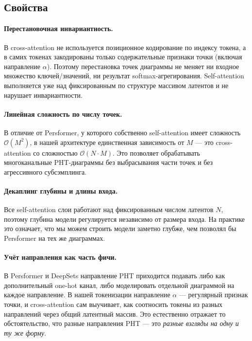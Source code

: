 \subsection{Свойства}

\paragraph{Перестановочная инвариантность.} В cross-attention не используется позиционное кодирование по индексу токена, а в самих токенах закодированы только содержательные признаки точки (включая направление $\alpha$). Поэтому перестановка точек диаграммы не меняет ни входное множество ключей/значений, ни результат softmax-агрегирования. Self-attention выполняется уже над фиксированным по структуре массивом латентов и не нарушает инвариантности.

\paragraph{Линейная сложность по числу точек.} В отличие от Persformer, у которого собственно self-attention имеет сложность $\mathcal{O}(M^2)$, в нашей архитектуре единственная зависимость от $M$ --- это cross-attention со сложностью $\mathcal{O}(N \cdot M)$. Это позволяет обрабатывать многоканальные PHT-диаграммы без выбрасывания части точек и без агрессивного субсэмплинга.

\paragraph{Декаплинг глубины и длины входа.} Все self-attention слои работают над фиксированным числом латентов $N$, поэтому глубина модели регулируется независимо от размера входа. На практике это означает, что мы можем строить модели заметно глубже, чем позволял бы Persformer на тех же диаграммах.

\paragraph{Учёт направления как часть фичи.} В Persformer и DeepSets направление PHT приходится подавать либо как дополнительный one-hot канал, либо моделировать отдельной диаграммой на каждое направление. В нашей токенизации направление $\alpha$ --- регулярный признак точки, и cross-attention сам выучивает, как соотносить токены из разных направлений через общий латентный массив. Это естественно отражает то обстоятельство, что разные направления PHT --- это \emph{разные взгляды на одну и ту же форму}.

